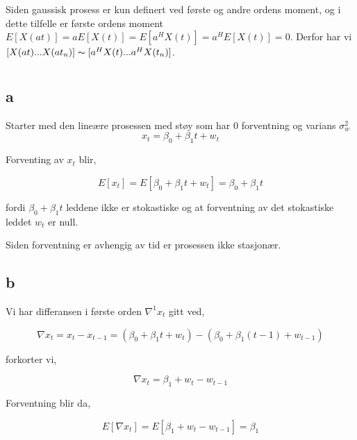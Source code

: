 \documentclass[10pt]{article}
\begin{document}
{Siden gaussisk prosess er kun definert ved første og andre ordens moment, og i dette tilfelle er første ordens moment $E[X(at)] = aE[X(t)] = E[a^{H}X(t)] = a^{H}E[X(t)] = 0$. Derfor har vi $[X(at)...X(at_{n})]\thicksim[a^{H}X(t)...a^{H}X(t_{n})]$.

\section{}
\subsection{a}

Starter med den lineære prosessen med støy som har 0 forventning og varians $\sigma_{w}^2$
\begin{equation}
  x_{t} = \beta_{0} + \beta_{1}t + w_{t}
\end{equation}


Forventing av $x_{t}$ blir,

\begin{equation*}
  E[x_{t}] = E[\beta_{0} + \beta_{1}t + w_{t}] = \beta_{0} + \beta_{1}t
\end{equation*}

fordi $\beta_{0} + \beta_{1}t$ leddene ikke er stokastiske og at forventning av det stokastiske leddet $w_{t}$ er null.

Siden forventning er avhengig av tid er prosessen ikke stasjonær.

\subsection{b}

Vi har differansen i første orden $\nabla ^1 x_{t}$ gitt ved,

\begin{equation*}
  \nabla x_{t} = x_{t} -  x_{t - 1} = (\beta_{0} + \beta_{1}t + w_{t}) - (\beta_{0} + \beta_{1}(t-1) + w_{t-1})
\end{equation*}

forkorter vi,

\begin{equation*}
  \nabla x_{t} = \beta_{1} + w_{t} - w_{t-1}
\end{equation*}


Forventning blir da,

\begin{equation*}
  E[\nabla x_{t}] = E[\beta_{1} + w_{t} - w_{t-1}] = \beta_{1}
\end{equation*}

}
\end{document}
